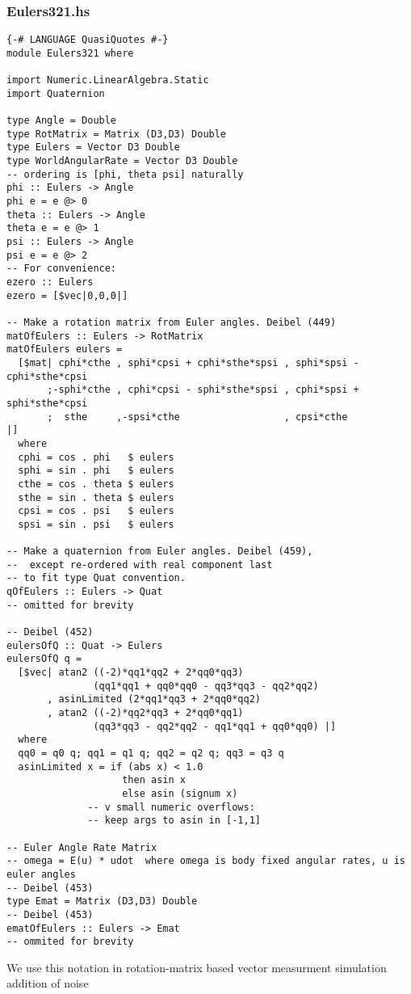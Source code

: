 \documentclass[12pt]{report}
\begin{document}
\subsubsection{Eulers321.hs}
\begin{lstlisting}
{-# LANGUAGE QuasiQuotes #-}
module Eulers321 where

import Numeric.LinearAlgebra.Static
import Quaternion

type Angle = Double
type RotMatrix = Matrix (D3,D3) Double
type Eulers = Vector D3 Double
type WorldAngularRate = Vector D3 Double
-- ordering is [phi, theta psi] naturally
phi :: Eulers -> Angle
phi e = e @> 0
theta :: Eulers -> Angle
theta e = e @> 1
psi :: Eulers -> Angle
psi e = e @> 2
-- For convenience:
ezero :: Eulers
ezero = [$vec|0,0,0|]

-- Make a rotation matrix from Euler angles. Deibel (449)
matOfEulers :: Eulers -> RotMatrix
matOfEulers eulers = 
  [$mat| cphi*cthe , sphi*cpsi + cphi*sthe*spsi , sphi*spsi - cphi*sthe*cpsi 
       ;-sphi*cthe , cphi*cpsi - sphi*sthe*spsi , cphi*spsi + sphi*sthe*cpsi
       ;  sthe     ,-spsi*cthe                  , cpsi*cthe                  |]
  where
  cphi = cos . phi   $ eulers
  sphi = sin . phi   $ eulers
  cthe = cos . theta $ eulers
  sthe = sin . theta $ eulers
  cpsi = cos . psi   $ eulers
  spsi = sin . psi   $ eulers

-- Make a quaternion from Euler angles. Deibel (459),
--  except re-ordered with real component last
-- to fit type Quat convention.
qOfEulers :: Eulers -> Quat
-- omitted for brevity

-- Deibel (452)
eulersOfQ :: Quat -> Eulers
eulersOfQ q =
  [$vec| atan2 ((-2)*qq1*qq2 + 2*qq0*qq3) 
               (qq1*qq1 + qq0*qq0 - qq3*qq3 - qq2*qq2)
       , asinLimited (2*qq1*qq3 + 2*qq0*qq2)
       , atan2 ((-2)*qq2*qq3 + 2*qq0*qq1) 
               (qq3*qq3 - qq2*qq2 - qq1*qq1 + qq0*qq0) |]
  where 
  qq0 = q0 q; qq1 = q1 q; qq2 = q2 q; qq3 = q3 q
  asinLimited x = if (abs x) < 1.0 
                    then asin x 
                    else asin (signum x) 
              -- v small numeric overflows: 
              -- keep args to asin in [-1,1]

-- Euler Angle Rate Matrix
-- omega = E(u) * udot  where omega is body fixed angular rates, u is euler angles
-- Deibel (453)
type Emat = Matrix (D3,D3) Double
-- Deibel (453)
ematOfEulers :: Eulers -> Emat
-- ommited for brevity
\end{lstlisting}

We use this notation in 
rotation-matrix based vector measurment simulation
addition of noise
\end{document}
